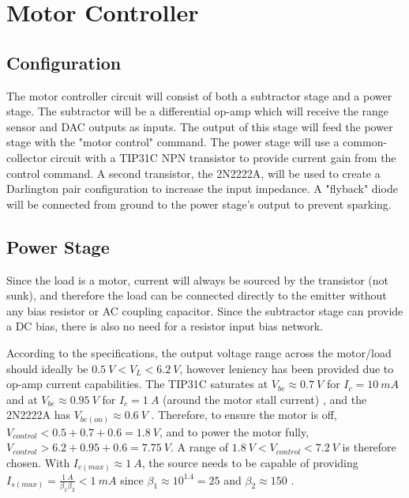 \graphicspath{{content/2_design/figures/}}
\section{Motor Controller}

\subsection{Configuration}

The motor controller circuit will consist of both a subtractor stage and a power stage. The subtractor will be a differential op-amp which will receive
the range sensor and DAC outputs as inputs. The output of this stage will feed the power stage with the "motor control" command. The power stage will use a common-collector circuit
with a TIP31C NPN transistor to provide current gain from the control command. A second transistor, the 2N2222A, will be used to create a Darlington pair configuration to increase the input impedance.
A "flyback" diode will be connected from ground to the power stage's output to prevent sparking.

\subsection{Power Stage}{\label{motorController_design_powerStage}}

Since the load is a motor, current will always be sourced by the transistor (not sunk), and therefore the load can be connected directly to the
emitter without any bias resistor or AC coupling capacitor. Since the subtractor stage can provide a DC bias, there is also no need for a resistor input bias network.

According to the specifications, the output voltage range across the motor/load should ideally be $\SI{0.5}{V} < V_L < \SI{6.2}{V}$, however leniency has been provided due to op-amp current capabilities.
The TIP31C saturates at $V_{be} \approx \SI{0.7}{V}$ for $I_c = \SI{10}{mA}$ and at $V_{be} \approx \SI{0.95}{V}$ for $I_c = \SI{1}{A}$
(around the motor stall current) \cite{datasheetTIP31C}, and the 2N2222A has $V_{be(on)} \approx \SI{0.6}{V}$ \cite{datasheet2N2222A}. Therefore, to ensure the motor is off, $V_{control} < 0.5 + 0.7 + 0.6 = \SI{1.8}{V}$,
and to power the motor fully, $V_{control} > 6.2 + 0.95 + 0.6 = \SI{7.75}{V}$. A range of $\SI{1.8}{V} < V_{control} < \SI{7.2}{V}$ is therefore chosen. With $I_{c(max)} \approx \SI{1}{A}$, the source needs to be capable of providing
$I_{s(max)} = \frac{\SI{1}{A}}{\beta_1 \beta_2} < \SI{1}{mA}$ since $\beta_1 \approx 10^{1.4} = 25$ \cite{datasheetTIP31C} and $\beta_2 \approx 150$ \cite{datasheet2N2222A}.


